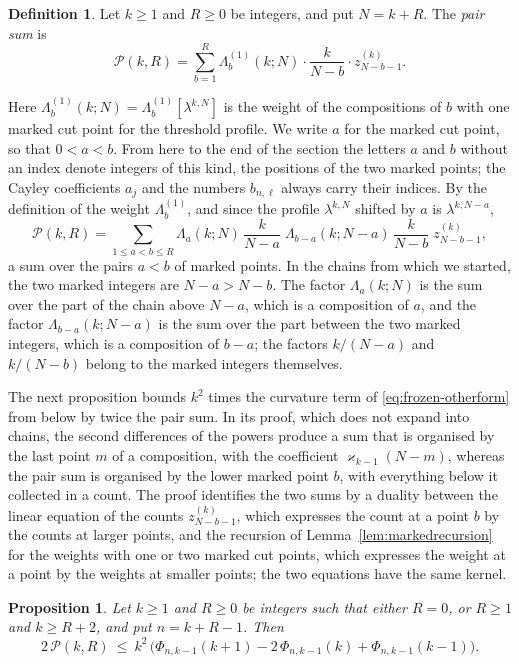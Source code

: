 \documentclass{amsart}
\newtheorem{proposition}[theorem]{Proposition}
\theoremstyle{definition}
\newtheorem{definition}[theorem]{Definition}
\theoremstyle{remark}
\numberwithin{equation}{section}
\begin{document}
\begin{definition}\label{def:markedpairs}
Let $k\ge1$ and $R\ge0$ be integers, and put $N=k+R$. The \emph{pair sum} is
\[
\mathcal P(k,R)=\sum_{b=1}^{R}\Lambda^{(1)}_b(k;N)\cdot\frac{k}{N-b}\cdot
z^{(k)}_{N-b-1}.
\]
\end{definition}

Here $\Lambda^{(1)}_b(k;N)=\Lambda^{(1)}_b[\lambda^{k,N}]$ is the weight of
the compositions of $b$ with one marked cut point for the threshold profile.
We write $a$ for the marked cut point, so that $0<a<b$. From here to the
end of the section the letters $a$ and $b$ without an index denote integers
of this kind, the positions of the two marked points; the Cayley
coefficients $a_j$ and the numbers $b_{n,\ell}$ always carry their indices.
By the definition of the weight $\Lambda^{(1)}_b$, and since the profile
$\lambda^{k,N}$ shifted by $a$ is $\lambda^{k,N-a}$,
\[
\mathcal P(k,R)=\sum_{1\le a<b\le R}\Lambda_a(k;N)\,\frac{k}{N-a}\;
\Lambda_{b-a}(k;N-a)\,\frac{k}{N-b}\;z^{(k)}_{N-b-1},
\]
a sum over the pairs $a<b$ of marked points. In the chains from which we
started, the two marked integers are $N-a>N-b$. The factor $\Lambda_a(k;N)$
is the sum over the part of the chain above $N-a$, which is a composition
of $a$, and the factor $\Lambda_{b-a}(k;N-a)$ is the sum over the part
between the two marked integers, which is a composition of $b-a$; the
factors $k/(N-a)$ and $k/(N-b)$ belong to the marked integers themselves.

The next proposition bounds $k^2$ times the curvature term of
\eqref{eq:frozen-otherform} from below by twice the pair sum. In its proof,
which does not expand into chains, the second differences of the powers produce a
sum that
is organised by the last point $m$ of a composition, with the coefficient
$\varkappa_{k-1}(N-m)$, whereas the pair sum is organised by the lower marked
point $b$, with everything below it collected in a count. The proof
identifies the two sums by a duality between the linear equation of the
counts $z^{(k)}_{N-b-1}$, which expresses the count at a point $b$ by the
counts at larger points, and the recursion of
Lemma~\ref{lem:markedrecursion} for the weights with one or two marked cut
points, which expresses the weight at a point by the weights at smaller
points; the two equations have the same kernel.

\begin{proposition}\label{prop:curvaturepair}
Let $k\ge1$ and $R\ge0$ be integers such that either $R=0$, or $R\ge1$ and
$k\ge R+2$, and put $n=k+R-1$. Then
\[
2\,\mathcal P(k,R)\ \le\ k^2\,\bigl(\Phi_{n,k-1}(k+1)-2\,\Phi_{n,k-1}(k)
+\Phi_{n,k-1}(k-1)\bigr).
\]
\end{proposition}
\end{document}
